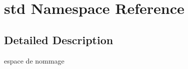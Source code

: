 \hypertarget{namespacestd}{\section{std Namespace Reference}
\label{namespacestd}
}


\subsection{Detailed Description}
espace de nommage 